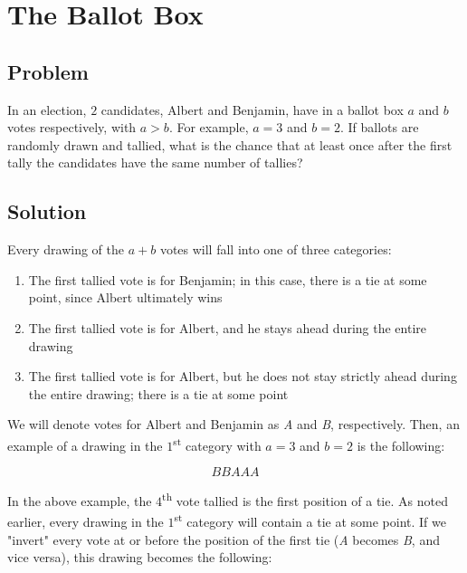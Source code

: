 \documentclass{article}
\date{}
\title{}
\author{Kaan Aksoy | Mar 27, 2020}
\begin{document}
\maketitle

\section{The Ballot Box}

\subsection{Problem}
In an election, $2$ candidates, Albert and Benjamin, have in a ballot 
box $a$ and $b$ votes respectively, with $a > b$. For example, $a=3$ 
and $b=2$. If ballots are randomly drawn and tallied, what is the 
chance that at least once after the first tally the candidates have 
the same number of tallies?

\subsection{Solution}

Every drawing of the $a+b$ votes will fall into one of three categories:

\begin{enumerate}
    \item The first tallied vote is for Benjamin; in this case, 
        there is a tie at some point, since Albert ultimately wins
    \item The first tallied vote is for Albert, and he stays ahead 
        during the entire drawing
    \item The first tallied vote is for Albert, but he does not stay 
        strictly ahead during the entire drawing; there is a tie at 
        some point
\end{enumerate}

\vspace{0.5cm}

We will denote votes for Albert and Benjamin as \textit{A} and 
\textit{B}, respectively. Then, an example of a drawing in the 
$1$\textsuperscript{st} category with $a=3$ and $b=2$ is the following:

$$BBAAA$$

In the above example, the $4$\textsuperscript{th} vote tallied 
is the first position  of a tie. As noted earlier, every drawing in the 
$1$\textsuperscript{st} category will contain a tie at some point. 
If we "invert" every vote at or before the position of the first tie 
(\textit{A} becomes \textit{B}, and vice versa), this drawing becomes 
the following:
\end{document}
